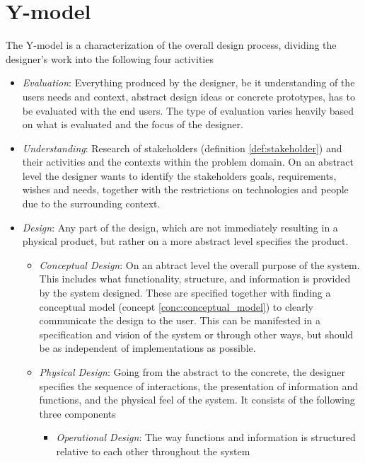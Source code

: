 \section{Y-model} \label{sec:y_model} 
The Y-model is a characterization of the overall design process, dividing the designer's work into the following four activities
\begin{itemize}
\item \emph{Evaluation}: 
  Everything produced by the designer, be it understanding of the users needs and context, abstract design ideas or concrete prototypes, has to be evaluated with the end users. The type of evaluation varies heavily based on what is evaluated and the focus of the designer.
\item \emph{Understanding}: 
  Research of stakeholders (definition \ref{def:stakeholder}) and their activities and the contexts within the problem domain. On an abstract level the designer wants to identify the stakeholders goals, requirements, wishes and needs, together with the restrictions on technologies and people due to the surrounding context.
\item \emph{Design}:
  Any part of the design, which are not immediately resulting in a physical product, but rather on a more abstract level specifies the product.
  \begin{itemize}
  \item \emph{Conceptual Design}: 
    On an abtract level the overall purpose of the system. This includes what functionality, structure, and information is provided by the system designed. These are specified together with finding a conceptual model (concept \ref{conc:conceptual_model}) to clearly communicate the design to the user. This can be manifested in a specification and vision of the system or through other ways, but should be as independent of implementations as possible.
    
  \item \emph{Physical Design}: 
    Going from the abstract to the concrete, the designer specifies the sequence of interactions, the presentation of information and functions, and the physical feel of the system. It consists of the following three components
    \begin{itemize}
    \item \emph{Operational Design}: 
      The way functions and information is structured relative to each other throughout the system
      

\end{itemize}
\end{itemize}
\end{itemize}
